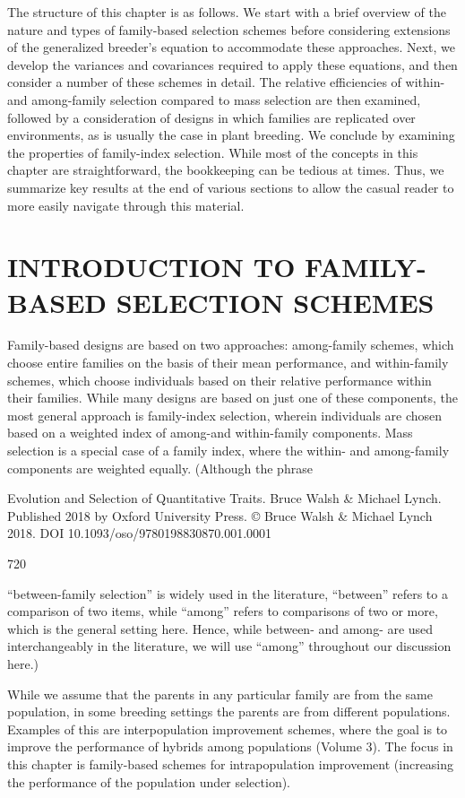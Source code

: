 \documentclass{article}
\begin{document}
The structure of this chapter is as follows. We start with a brief overview of the nature and types of family-based selection schemes before considering extensions of the generalized breeder's equation to accommodate these approaches. Next, we develop the variances and covariances required to apply these equations, and then consider a number of these schemes in detail. The relative efficiencies of within- and among-family selection compared to mass selection are then examined, followed by a consideration of designs in which families are replicated over environments, as is usually the case in plant breeding. We conclude by examining the properties of family-index selection. While most of the concepts in this chapter are straightforward, the bookkeeping can be tedious at times. Thus, we summarize key results at the end of various sections to allow the casual reader to more easily navigate through this material.

\section{INTRODUCTION TO FAMILY-BASED SELECTION SCHEMES}
Family-based designs are based on two approaches: among-family schemes, which choose entire families on the basis of their mean performance, and within-family schemes, which choose individuals based on their relative performance within their families. While many designs are based on just one of these components, the most general approach is family-index selection, wherein individuals are chosen based on a weighted index of among-and within-family components. Mass selection is a special case of a family index, where the within- and among-family components are weighted equally. (Although the phrase

Evolution and Selection of Quantitative Traits. Bruce Walsh & Michael Lynch. Published 2018 by Oxford University Press. © Bruce Walsh & Michael Lynch 2018. DOI 10.1093/oso/9780198830870.001.0001

720

“between-family selection” is widely used in the literature, “between” refers to a comparison of two items, while “among” refers to comparisons of two or more, which is the general setting here. Hence, while between- and among- are used interchangeably in the literature, we will use “among” throughout our discussion here.)

While we assume that the parents in any particular family are from the same population, in some breeding settings the parents are from different populations. Examples of this are interpopulation improvement schemes, where the goal is to improve the performance of hybrids among populations (Volume 3). The focus in this chapter is family-based schemes for intrapopulation improvement (increasing the performance of the population under selection).
\end{document}
